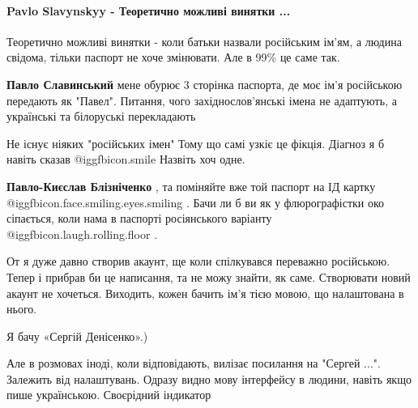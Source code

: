  
 
 
 
 

\paragraph{Pavlo Slavynskyy - Теоретично можливі винятки ...}

\begin{itemize} %
Теоретично можливі винятки - коли батьки назвали російським ім'ям, а людина свідома, тільки паспорт не хоче змінювати.
Але в 99\% це саме так.

\begin{itemize} %
\textbf{Павло Славинський} мене обурює 3 сторінка паспорта, де моє ім'я російською передають як "Павел". Питання, чого західнослов'янські імена не адаптують, а українські та білоруські перекладають

Не існує ніяких "російських імен" Тому що самі узкіє це фікція. Діагноз я б навіть сказав  @igg{fbicon.smile}  Назвіть хоч одне.

\textbf{Павло-Києслав Блізніченко} , та поміняйте вже той паспорт на ІД картку  @igg{fbicon.face.smiling.eyes.smiling} . Бачи ли б ви як у флюрографістки око сіпається, коли нама в паспорті росіянського варіанту  @igg{fbicon.laugh.rolling.floor} .
\end{itemize} %


От я дуже давно створив акаунт, ще коли спілкувався переважно російською. Тепер
і прибрав би це написання, та не можу знайти, як саме. Створювати новий акаунт
не хочеться. Виходить, кожен бачить ім'я тією мовою, що налаштована в нього.

\begin{itemize} %
Я бачу «Сергій Денісенко».)


Але в розмовах іноді, коли відповідають, вилізає посилання на "Сергей ...".
Залежить від налаштувань. Одразу видно мову інтерфейсу в людини, навіть якщо
пише українською. Своєрідний індикатор


\end{itemize}
\end{itemize}
